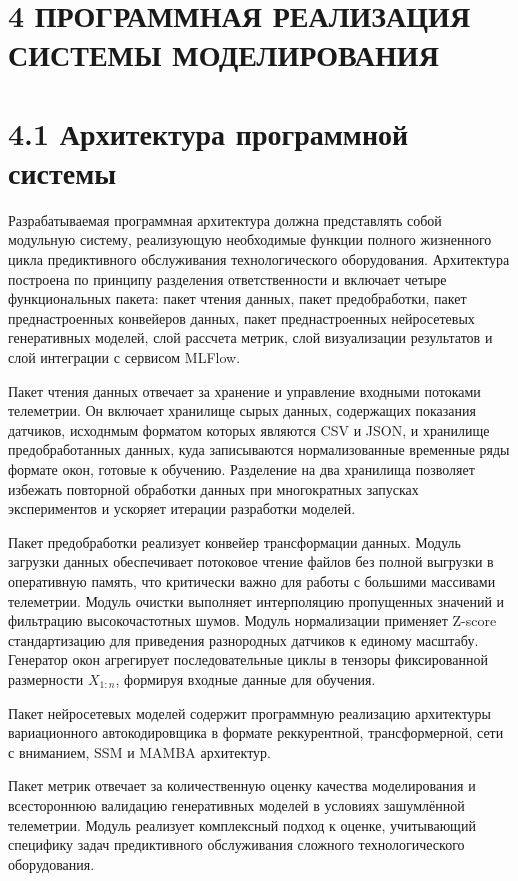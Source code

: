 \documentclass[14pt, a4paper, oneside]{extreport}
\begin{document}
\clearpage


\section{4 ПРОГРАММНАЯ РЕАЛИЗАЦИЯ СИСТЕМЫ МОДЕЛИРОВАНИЯ}
\section{4.1 Архитектура программной системы}
\vspace{1em}

Разрабатываемая программная архитектура должна представлять собой модульную систему, реализующую необходимые функции полного жизненного цикла предиктивного обслуживания технологического оборудования. Архитектура построена по принципу разделения ответственности и включает четыре функциональных пакета: пакет чтения данных, пакет предобработки, пакет преднастроенных конвейеров данных, пакет преднастроенных нейросетевых генеративных моделей, слой рассчета метрик, слой визуализации результатов и слой интеграции с сервисом MLFlow.

Пакет чтения данных отвечает за хранение и управление входными потоками телеметрии. Он включает хранилище сырых данных, содержащих показания датчиков, исходнмым форматом которых являются CSV и JSON, и хранилище предобработанных данных, куда записываются нормализованные временные ряды формате окон, готовые к обучению. Разделение на два хранилища позволяет избежать повторной обработки данных при многократных запусках экспериментов и ускоряет итерации разработки моделей.

Пакет предобработки реализует конвейер трансформации данных. Модуль загрузки данных обеспечивает потоковое чтение файлов без полной выгрузки в оперативную память, что критически важно для работы с большими массивами телеметрии. Модуль очистки выполняет интерполяцию пропущенных значений и фильтрацию высокочастотных шумов. Модуль нормализации применяет Z-score стандартизацию для приведения разнородных датчиков к единому масштабу. Генератор окон агрегирует последовательные циклы в тензоры фиксированной размерности $X_{1:n}$, формируя входные данные для обучения.

Пакет нейросетевых моделей содержит программную реализацию архитектуры вариационного автокодировщика в формате реккурентной, трансформерной, сети с вниманием, SSM и MAMBA архитектур.

Пакет метрик отвечает за количественную оценку качества моделирования и всестороннюю валидацию генеративных моделей в условиях зашумлённой телеметрии. Модуль реализует комплексный подход к оценке, учитывающий специфику задач предиктивного обслуживания сложного технологического оборудования.
\end{document}
